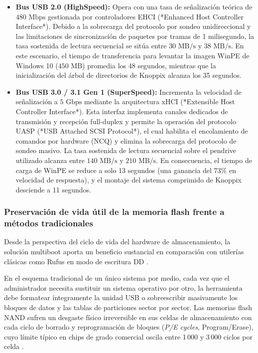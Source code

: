 \documentclass[12pt]{article}
\begin{document}
\begin{itemize}[noitemsep, topsep=2pt]
    \item \textbf{Bus USB 2.0 (HighSpeed):} Opera con una tasa de señalización teórica de $480\text{ Mbps}$ gestionada por controladores EHCI (*Enhanced Host Controller Interface*). Debido a la sobrecarga del protocolo por sondeo unidireccional y las limitaciones de sincronización de paquetes por tramas de 1 milisegundo, la tasa sostenida de lectura secuencial se sitúa entre $30\text{ MB/s}$ y $38\text{ MB/s}$. En este escenario, el tiempo de transferencia para levantar la imagen WinPE de Windows 10 ($450\text{ MB}$) promedia los 48 segundos, mientras que la inicialización del árbol de directorios de Knoppix alcanza los 35 segundos.
    \item \textbf{Bus USB 3.0 / 3.1 Gen 1 (SuperSpeed):} Incrementa la velocidad de señalización a $5\text{ Gbps}$ mediante la arquitectura xHCI (*Extensible Host Controller Interface*). Esta interfaz implementa canales dedicados de transmisión y recepción full-duplex y permite la operación del protocolo UASP (*USB Attached SCSI Protocol*), el cual habilita el encolamiento de comandos por hardware (NCQ) y elimina la sobrecarga del protocolo de sondeo masivo. La tasa sostenida de lectura secuencial sobre el pendrive utilizado alcanza entre $140\text{ MB/s}$ y $210\text{ MB/s}$. En consecuencia, el tiempo de carga de WinPE se reduce a solo 13 segundos (una ganancia del 73\% en velocidad de respuesta), y el montaje del sistema comprimido de Knoppix desciende a 11 segundos.
\end{itemize}

\subsubsection{Preservación de vida útil de la memoria flash frente a métodos tradicionales}

Desde la perspectiva del ciclo de vida del hardware de almacenamiento, la solución multiboot aporta un beneficio sustancial en comparación con utilerías clásicas como Rufus en modo de escritura DD \parencite{batard2024rufus}.

En el esquema tradicional de un único sistema por medio, cada vez que el administrador necesita sustituir un sistema operativo por otro, la herramienta debe formatear íntegramente la unidad USB o sobreescribir masivamente los bloques de datos y las tablas de particiones sector por sector. Las memorias flash NAND sufren un desgaste físico irreversible en sus celdas de almacenamiento con cada ciclo de borrado y reprogramación de bloques (\textit{P/E cycles}, Program/Erase), cuyo límite típico en chips de grado comercial oscila entre 1\,000 y 3\,000 ciclos por celda \parencite[\S12.1, p.\ 390]{silberschatz2006fundamentos}.
\end{document}
